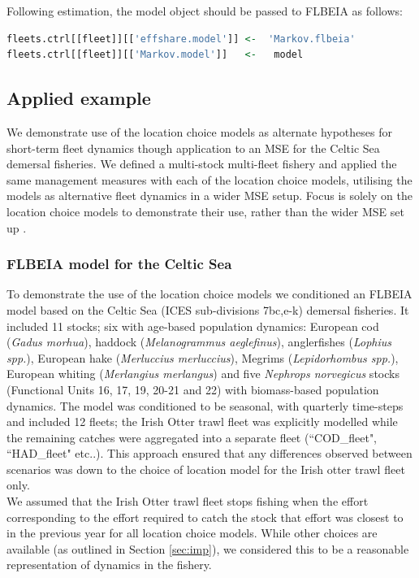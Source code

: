 \documentclass[12pt, halfline, a4paper]{ouparticle}
\begin{document}
Following estimation, the model object should be passed to FLBEIA as follows:

\begin{lstlisting}[language=R]
fleets.ctrl[[fleet]][['effshare.model']] <-  'Markov.flbeia'
fleets.ctrl[[fleet]][['Markov.model']]   <-   model 
\end{lstlisting}

\subsection{Applied example}

We demonstrate use of the location choice models as alternate hypotheses for
short-term fleet dynamics though application to an MSE for the Celtic Sea
demersal fisheries. We defined a multi-stock multi-fleet fishery and applied
the same management measures with each of the location choice models, utilising
the models as alternative fleet dynamics in a wider MSE setup. Focus is solely
on the location choice models to demonstrate their use, rather than the wider
MSE set up \citep{Graham2016}.

\subsubsection{FLBEIA model for the Celtic Sea}

To demonstrate the use of the location choice models we conditioned an FLBEIA
model based on the Celtic Sea (ICES sub-divisions 7bc,e-k) demersal fisheries.
It included 11 stocks; six with age-based population dynamics: European cod
(\textit{Gadus morhua}), haddock (\textit{Melanogrammus aeglefinus}),
anglerfishes (\textit{Lophius spp.}), European hake (\textit{Merluccius
	merluccius}), Megrims (\textit{Lepidorhombus spp.}), European whiting
(\textit{Merlangius merlangus}) and five \textit{Nephrops norvegicus} stocks
(Functional Units 16, 17, 19, 20-21 and 22) with biomass-based population
dynamics. The model was conditioned to be seasonal, with quarterly time-steps
and included 12 fleets; the Irish Otter trawl fleet was explicitly modelled
while the remaining catches were aggregated into a separate fleet
(``COD\_fleet", ``HAD\_fleet" etc..). This approach ensured that any
differences observed between scenarios was down to the choice of location model
for the Irish otter trawl fleet only. \\

We assumed that the Irish Otter trawl fleet stops fishing when the effort
corresponding to the effort required to catch the stock that effort was closest
to in the previous year for all location choice models. While other choices are
available (as outlined in Section \ref{sec:imp}), we considered this to be a
reasonable representation of dynamics in the fishery. 
\end{document}
